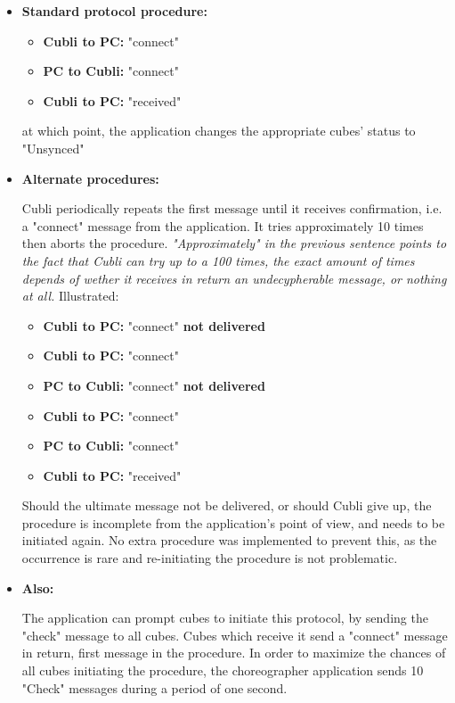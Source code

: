 \begin{itemize}
\item[] \textbf{Standard protocol procedure:}

\begin{itemize}
\item[] \textbf{Cubli to PC:} "connect"
\item[] \textbf{PC to Cubli:} "connect"
\item[] \textbf{Cubli to PC:} "received"
\end{itemize}

at which point, the application changes the appropriate cubes' status to "Unsynced"\\

\item[] \textbf{Alternate procedures:}

Cubli periodically repeats the first message until it receives confirmation, i.e. a "connect" message from the application. It tries approximately 10 times then aborts the procedure. \textit{"Approximately" in the previous sentence points to the fact that Cubli can try up to a 100 times, the exact amount of times depends of wether it receives in return an undecypherable message, or nothing at all.} Illustrated:

\begin{itemize}
\item[] \textbf{Cubli to PC:} "connect" \textbf{not delivered}
\item[] \textbf{Cubli to PC:} "connect"
\item[] \textbf{PC to Cubli:} "connect" \textbf{not delivered}
\item[] \textbf{Cubli to PC:} "connect"
\item[] \textbf{PC to Cubli:} "connect" 
\item[] \textbf{Cubli to PC:} "received"
\end{itemize}

Should the ultimate message not be delivered, or should Cubli give up, the procedure is incomplete from the application's point of view, and needs to be initiated again. No extra procedure was implemented to prevent this, as the occurrence is rare and re-initiating the procedure is not problematic.


\item[] \textbf{Also:}

The application can prompt cubes to initiate this protocol, by sending the "check" message to all cubes. Cubes which receive it send a "connect" message in return, first message in the procedure. In order to maximize the chances of all cubes initiating the procedure, the choreographer application sends 10 "Check" messages during a period of one second.


\end{itemize}

